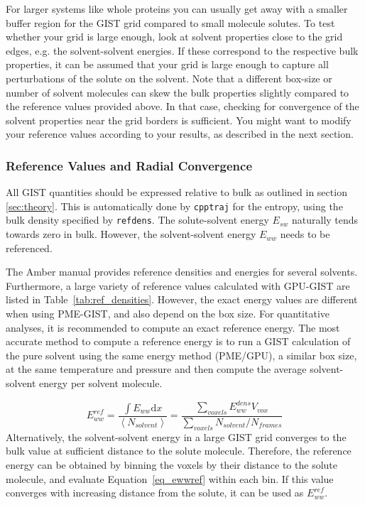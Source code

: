 \documentclass[9pt,tutorial]{livecoms}
\newcommand{\software}{\texttt}
\newcommand\inlinecode{\texttt}
\begin{document}
For larger systems like whole proteins you can usually get away with a smaller buffer region for the GIST grid compared to small molecule solutes.
To test whether your grid is large enough, look at solvent properties close to the grid edges, e.g. the solvent-solvent energies.
If these correspond to the respective bulk properties, it can be assumed that your grid is large enough to capture all perturbations of the solute on the solvent.
Note that a different box-size or number of solvent molecules can skew the bulk properties slightly compared to the reference values provided above.
In that case, checking for convergence of the solvent properties near the grid borders is sufficient. You might want to modify your reference values according to your results, as described in the next section.

\subsubsection{Reference Values and Radial Convergence}
All GIST quantities should be expressed relative to bulk as outlined in section \ref{sec:theory}.
This is automatically done by \software{cpptraj} for the entropy, using the bulk density specified by \inlinecode{refdens}.
The solute-solvent energy $E_{sw}$ naturally tends towards zero in bulk.
However, the solvent-solvent energy $E_{ww}$ needs to be referenced.

The Amber manual provides reference densities and energies for several solvents.
Furthermore, a large variety of reference values calculated with GPU-GIST are listed in Table~\ref{tab:ref_densities}. 
However, the exact energy values are different when using PME-GIST, and also depend on the box size.
For quantitative analyses, it is recommended to compute an exact reference energy.
The most accurate method to compute a reference energy is to run a GIST calculation of the pure solvent using the same energy method (PME/GPU), a similar box size, at the same temperature and pressure and then compute the average solvent-solvent energy per solvent molecule.

\begin{equation}
\label{eq_ewwref}
E_{ww}^\textit{ref} = \frac{\int{E_{ww}} \mathrm{d}x}{\left<N_\textit{solvent}\right>}
  = \frac{\sum_\textit{voxels}E_{ww}^\textit{dens} V_\textit{vox}}{\sum_\textit{voxels}{N_\textit{solvent}} / N_\textit{frames}}
\end{equation}
Alternatively, the solvent-solvent energy in a large GIST grid converges to the bulk value at sufficient distance to the solute molecule. 
Therefore, the reference energy can be obtained by binning the voxels by their distance to the solute molecule, and evaluate Equation~\ref{eq_ewwref} within each bin.
If this value converges with increasing distance from the solute, it can be used as $E_{ww}^\textit{ref}$.
\end{document}
